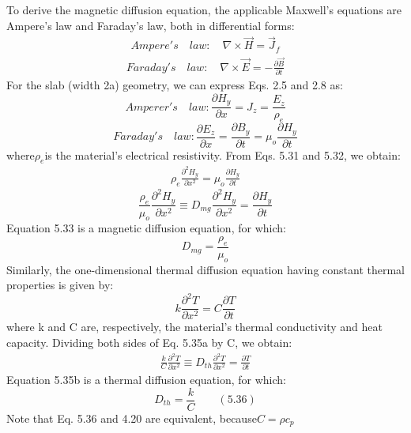 To derive the magnetic diffusion equation, the applicable Maxwell’s equations are
Ampere’s law and Faraday’s law, both in differential forms:
\begin{align*}%
Ampere's\quad law:\quad \nabla\times\vec{H}=\vec{J}_{f}\tag{2.5}
\end{align*}
\begin{align*}%
Faraday's\quad law:\quad\nabla\times\vec{E}=-\frac{\partial\vec{B}}{\partial t}\tag{2.8}
\end{align*}
For the slab (width 2a) geometry, we can express Eqs. 2.5 and 2.8 as:
\begin{equation}%
Amperer's\quad law:\frac{\partial H_{y}}{\partial x}=J_{z}=\frac{E_{z}}{\rho_{e}}
\end{equation}
\begin{equation}%
Faraday's\quad law:\frac{\partial E_{z}}{\partial x}=\frac{\partial B_{y}}{\partial t}=\mu_{o}\frac{\partial H_{y}}{\partial t}
\end{equation}
where$\rho_e$is the material’s electrical resistivity. From Eqs. 5.31 and 5.32, we obtain:
\begin{align*}%
\rho_{e}\frac{\partial^{2}H_{y}}{\partial x^{2}}=\mu_{o}\frac{\partial H_{y}}{\partial t}
\end{align*}
\begin{equation}%
\frac{\rho_{e}}{\mu_{o}}\frac{\partial^{2}H_{y}}{\partial x^{2}}\equiv D_{mg}\frac{\partial^{2}H_{y}}{\partial x^{2}}=\frac{\partial H_{y}}{\partial t}
\end{equation}
Equation 5.33 is a magnetic diffusion equation, for which:
\begin{equation}%
D_{mg}=\frac{{\rho}_{e}}{\mu_{o}}
\end{equation}
Similarly, the one-dimensional thermal diffusion equation having constant thermal
properties is given by:
\begin{equation}%
k\frac{\partial^{2}T}{\partial x^{2}}=C\frac{\partial T}{\partial t}
\end{equation}
where k and C are, respectively, the material’s thermal conductivity and heat
capacity. Dividing both sides of Eq. 5.35a by C, we obtain:
\begin{align*}%
\frac{k}{C}\frac{\partial^{2}T}{\partial x^{2}}\equiv D_{th}\frac{\partial^{2}T}{\partial x^{2}}=\frac{\partial T}{\partial t}\tag{5.35b}
\end{align*}
Equation 5.35b is a thermal diffusion equation, for which:
\begin{equation}%
D_{th}=\frac{k}{C}\qquad(5.36)
\end{equation}
Note that Eq. 5.36 and 4.20 are equivalent, because$C=\rho c_p$

